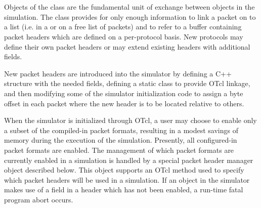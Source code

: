 %
%
\section{}

Objects of the class  are the fundamental unit of
exchange between objects in the simulation.
The  class provides for only enough information to
link a packet on to a list (i.e. in a  or on a free
list of packets) and to refer to a buffer containing packet headers
which are defined on a per-protocol basis.
New protocols may define their own packet headers or may extend
existing headers with additional fields.

New packet headers are introduced into the simulator
by defining a C++ structure with the needed
fields, defining a static class to provide
OTcl linkage, and then modifying some of the simulator initialization
code to assign a byte offset in each packet where the new header
is to be located relative to others.

When the simulator is initialized through OTcl,
a user may choose to enable
only a subset of the compiled-in packet formats, resulting in
a modest savings of memory during the execution of the simulation.
Presently, all configured-in packet formats are enabled.
The management of which packet formats are currently enabled
in a simulation is handled by a special packet header manager
object described below.
This object supports an OTcl method used to specify
which packet headers will be used in a simulation.
If an object in the simulator makes use of a field in a header
which has not been enabled, a run-time fatal program abort occurs.

\subsection{}

